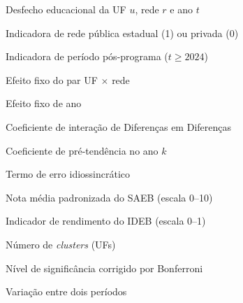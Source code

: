 
\begin{simbolos}
    \item[$Y_{urt}$]              Desfecho educacional da UF $u$, rede $r$ e ano $t$
    \item[$D_r$]                  Indicadora de rede pública estadual (1) ou privada (0)
    \item[$\mathit{Post}_t$]      Indicadora de período pós-programa ($t \geq 2024$)
    \item[$\alpha_{ur}$]          Efeito fixo do par UF $\times$ rede
    \item[$\lambda_t$]            Efeito fixo de ano
    \item[$\beta$]                Coeficiente de interação de Diferenças em Diferenças
    \item[$\theta_k$]             Coeficiente de pré-tendência no ano $k$
    \item[$\varepsilon_{urt}$]    Termo de erro idiossincrático
    \item[$N$]                    Nota média padronizada do SAEB (escala 0--10)
    \item[$P$]                    Indicador de rendimento do IDEB (escala 0--1)
    \item[$G$]                    Número de \textit{clusters} (UFs)
    \item[$\alpha_{\text{Bonf}}$] Nível de significância corrigido por Bonferroni
    \item[$\Delta$]               Variação entre dois períodos
\end{simbolos}
